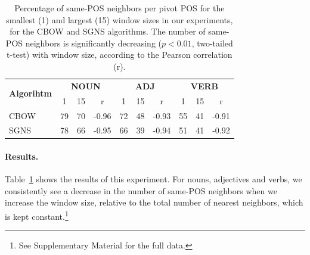 \documentclass[11pt,a4paper]{article}
\begin{document}
    \begin{table}[t]
    \centering
    \setlength\tabcolsep{2.75pt}
    \begin{tabular}{l|ccc|ccc|ccc}
    \multirow{2}{1cm}{\bf Algorihtm}
    & \multicolumn{3}{c|}{\bf NOUN} & \multicolumn{3}{c|}{\bf ADJ} & \multicolumn{3}{c}{\bf VERB} \\
    & 1 & 15 & r & 1 & 15 & r & 1 & 15 & r \\
    \hline
    CBOW & 79 & 70 & -0.96 & 72 & 48 & -0.93 & 55 & 41 & -0.91 \\
    SGNS & 78 & 66 & -0.95 & 66 & 39 & -0.94 & 51 & 41 & -0.92 
    \end{tabular}
    \caption{Percentage of same-POS neighbors per pivot POS for the smallest (1) and largest (15)
        window sizes in our experiments, for the CBOW and SGNS algorithms.
        The number of same-POS neighbors is significantly decreasing ($p<0.01$, two-tailed t-test)
        with window size, according to the Pearson correlation (r).
    \label{tab:nn_pos_hist}}
    \end{table}
    
    \paragraph{Results.}
    
    Table~\ref{tab:nn_pos_hist} shows the results of this experiment.
    For nouns, adjectives and verbs, we consistently see a decrease in
    the  number of same-POS neighbors when we increase the window size,
    relative to the total number of nearest neighbors, which is kept
    constant.\footnote{See Supplementary Material for the full data.}
    
\end{document}
